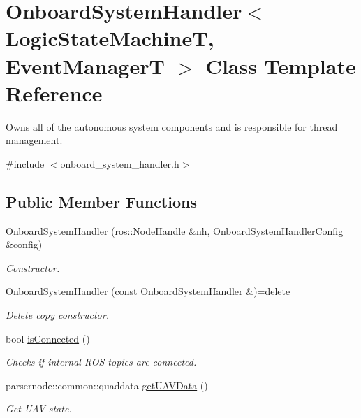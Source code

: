 \hypertarget{classOnboardSystemHandler}{\section{Onboard\-System\-Handler$<$ Logic\-State\-Machine\-T, Event\-Manager\-T $>$ Class Template Reference}
\label{classOnboardSystemHandler}
}


Owns all of the autonomous system components and is responsible for thread management.  




{\ttfamily \#include $<$onboard\-\_\-system\-\_\-handler.\-h$>$}

\subsection*{Public Member Functions}
\begin{DoxyCompactItemize}
\item 
\hyperlink{classOnboardSystemHandler_a50433d9368004a07ee1d410516f16d0f}{Onboard\-System\-Handler} (ros\-::\-Node\-Handle \&nh, Onboard\-System\-Handler\-Config \&config)
\begin{DoxyCompactList}\small\item\em Constructor. \end{DoxyCompactList}\item 
\hyperlink{classOnboardSystemHandler_a6ab804a5c415b7dcde04babd918738e2}{Onboard\-System\-Handler} (const \hyperlink{classOnboardSystemHandler}{Onboard\-System\-Handler} \&)=delete
\begin{DoxyCompactList}\small\item\em Delete copy constructor. \end{DoxyCompactList}\item 
bool \hyperlink{classOnboardSystemHandler_afd53ef53f99eb8b8af8b15dd1b059eba}{is\-Connected} ()
\begin{DoxyCompactList}\small\item\em Checks if internal R\-O\-S topics are connected. \end{DoxyCompactList}\item 
parsernode\-::common\-::quaddata \hyperlink{classOnboardSystemHandler_ad39e806fb8edd6281d10b8575345ad6d}{get\-U\-A\-V\-Data} ()
\begin{DoxyCompactList}\small\item\em Get U\-A\-V state. \end{DoxyCompactList}\end{DoxyCompactItemize}


